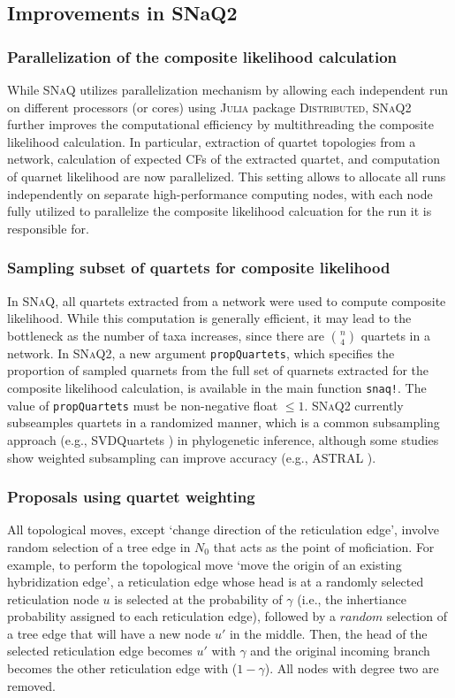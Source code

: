 \documentclass[unnumsec,webpdf,contemporary,large]{oup-authoring-template}%
\theoremstyle{thmstyleone}%
\theoremstyle{thmstyletwo}%
\theoremstyle{thmstylethree}%
\begin{document}
\subsection{Improvements in SNaQ2}\label{subsec2}
\subsubsection{Parallelization of the composite likelihood calculation}\label{subsubsec1}
While \textsc{SNaQ} utilizes parallelization mechanism by allowing each independent run on different processors (or cores) using \textsc{Julia} package \textsc{Distributed}, \textsc{SNaQ2} further improves the computational efficiency by multithreading the composite likelihood calculation. In particular, extraction of quartet topologies from a network, calculation of expected CFs of the extracted quartet, and computation of quarnet likelihood are now parallelized. This setting allows to allocate all runs independently on separate high-performance computing nodes, with each node fully utilized to parallelize the composite likelihood calcuation for the run it is responsible for.

\subsubsection{Sampling subset of quartets for composite likelihood}\label{subsubsec3}
In \textsc{SNaQ}, all quartets extracted from a network were used to compute composite likelihood. While this computation is generally efficient, it may lead to the bottleneck as the number of taxa increases, since there are $n \choose 4$ quartets in a network. In \textsc{SNaQ2}, a new argument \texttt{propQuartets}, which specifies the proportion of sampled quarnets from the full set of quarnets extracted for the composite likelihood calculation, is available in the main function \texttt{snaq!}. The value of \texttt{propQuartets} must be non-negative float $\le 1$. \textsc{SNaQ2} currently subseamples quartets in a randomized manner, which is a common subsampling approach (e.g., SVDQuartets \citep{chifman2014,chifman2015}) in phylogenetic inference, although some studies show weighted subsampling can improve accuracy (e.g., ASTRAL \citep{zhang2022b}).

\subsubsection{Proposals using quartet weighting}\label{subsubsec2}
All topological moves, except `change direction of the reticulation edge', involve random selection of a tree edge in $N_0$ that acts as the point of moficiation. For example, to perform the topological move `move the origin of an existing hybridization edge', a reticulation edge whose head is at a randomly selected reticulation node $u$ is selected at the probability of $\gamma$ (i.e., the inhertiance probability assigned to each reticulation edge), followed by a $random$ selection of a tree edge that will have a new node $u'$ in the middle. Then, the head of the selected reticulation edge becomes $u'$ with $\gamma$ and the original incoming branch becomes the other reticulation edge with ($1-\gamma$). All nodes with degree two are removed.
\end{document}
